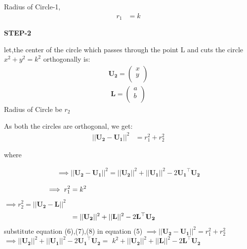 \documentclass[journal,12pt,twocolumn]{IEEEtran}
\let\vec\mathbf
\begin{document}
Radius of Circle-1,
\boldmath
\begin{align}
 r_1  &= k
\end{align}
\unboldmath

\textbf{STEP-2}

let,the center of the  circle which passes through the point  L and cuts the circle {$x^2+y^2=k^2$} orthogonally is:
\boldmath 
\begin{align} 
\vec{U_2} = \begin{pmatrix}x \\ y \\ \end{pmatrix}
\end{align} 
\begin{align} 
\vec{L}= \begin{pmatrix}a \\ b \\ \end{pmatrix} 
\end{align}
\unboldmath
Radius of Circle be $r_2$

As both the circles are orthogonal, we get:\vspace{1mm}
\boldmath
\begin{align}
  ||\vec{U_2-U_1}||^2 &= r_1^2 +r_2^2
\end{align}


where

\begin{align}
\implies||\vec{U_2-U_1}||^2=||\vec{U_2}||^2 + ||\vec{U_1}||^2 - 2{\vec{U_1}}^{\top}\vec{U_2}
\end{align}

\begin{align}
\hspace{-3.25cm}\implies r_1^2=k^2\hspace{3cm}
\end{align}
$\implies r_2^2=||\vec{U_2-L}||^2$
\begin{align}
\hspace{-1.50cm}=||\vec{U_2}||^2+||\vec{L}||^2-2{\vec{L}}^{\top}\vec{U_2}
\end{align}
substitute equation (6),(7),(8) in equation (5)
$\implies ||{\vec{{U_2} - {U_1}}}||^2 = r_1^2 + r_2^2$\vspace{3mm}
$\implies ||\vec{U_2}||^2+||\vec{U_1}||^2-2\vec{U_1}^{\top}\vec{U_2}=$
\vspace{3mm}
\hspace{3cm}
$k^2+||\vec{U_2}||^2+||\vec{L}||^2-2{\vec{L}}^{\top}\vec{U_2}$
\unboldmath
\end{document}
